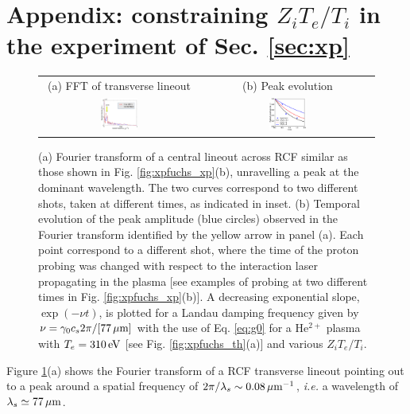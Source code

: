 \documentclass[
 reprint,
 superscriptaddress,
 amsmath,amssymb,
 aps,
]{revtex4-1}
\def\tc{\textcolor{red}}
\begin{document}
\section*{Appendix: constraining $Z_iT_e/T_i$ in the experiment of Sec. \ref{sec:xp}}
\label{sec:ztesti}
\begin{figure}
\begin{tabular}{cc}
(a) FFT of transverse lineout&
(b) Peak evolution\\
\includegraphics[width=0.24\textwidth]{fucshsfft.eps}& 
\includegraphics[width=0.22\textwidth]{fuchsztesti_new.eps}
\end{tabular}
\caption{ \label{fig:xpfuchs_ap}  
(a) Fourier transform of a central lineout across RCF similar as those shown in Fig. \ref{fig:xpfuchs_xp}(b), unravelling a peak at the dominant wavelength. The two curves correspond to two different shots, taken at different times, as indicated in inset.
(b) Temporal evolution of the peak amplitude (blue circles) observed in the Fourier transform identified by the yellow arrow in panel (a). Each point correspond to a different shot, where the time of the proton probing was changed with respect to the interaction laser propagating in the plasma [see examples of probing at two different times in  Fig. \ref{fig:xpfuchs_xp}(b)]. A decreasing exponential slope,  $\exp(-\nu t)$, is plotted for a Landau damping frequency given by $\nu=\gamma_0c_s2\pi/[77\,\rm\mu m]$ with the use of  Eq. \eqref{eq:g0} for a He$^{2+}$ plasma with \tc{$T_e=310\,\rm eV$} [see Fig. \ref{fig:xpfuchs_th}(a)] and various $Z_iT_e/T_i$.
}
\end{figure}
Figure \ref{fig:xpfuchs_ap}(a) shows the Fourier transform of a RCF transverse lineout pointing out to a peak around a spatial frequency of  $2\pi/\lambda_s\sim 0.08\, \rm \mu m^{-1}$, \emph{i.e.} a wavelength of $\lambda_s \simeq 77\, \rm \mu m$.
\end{document}
